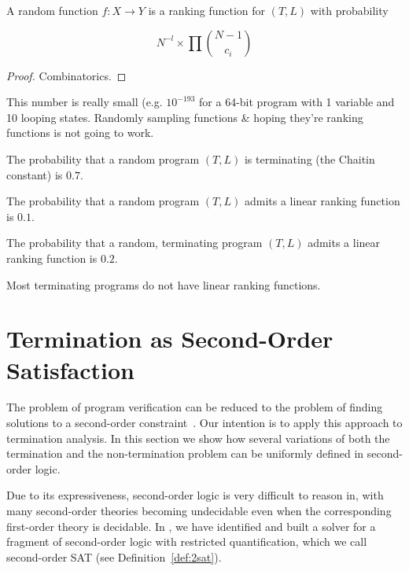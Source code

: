 \documentclass[a4paper]{llncs}
\begin{document}
\begin{theorem}
 A random function $f : X \to Y$ is a ranking function for $(T, L)$ with probability

 $$N^{-l} \times \prod {{N-1} \choose c_i}$$
\end{theorem}

\begin{proof}
 Combinatorics.
\end{proof}


\begin{corollary}
 This number is really small (e.g. $10^{-193}$ for a 64-bit program with 1 variable and 10 looping states.
 Randomly sampling functions \& hoping they're ranking functions is not going to work.
\end{corollary}


\begin{conjecture}
 The probability that a random program $(T, L)$ is terminating (the Chaitin constant)
 is $0.7$.
\end{conjecture}

\begin{conjecture}
 The probability that a random program $(T, L)$ admits a linear ranking function is
 $0.1$.
\end{conjecture}

\begin{conjecture}
 The probability that a random, terminating program $(T, L)$ admits a linear ranking function
 is $0.2$.
\end{conjecture}


\begin{corollary}
 Most terminating programs do not have linear ranking functions.
\end{corollary}
\fi


\section{Termination as Second-Order Satisfaction} \label{sec:second.order}


The problem of program verification can be reduced to the problem of finding
solutions to a second-order
constraint~\cite{DBLP:conf/pldi/GrebenshchikovLPR12,DBLP:conf/pldi/GulwaniSV08}. 
Our intention is to apply this approach to termination analysis.  In this
section we show how several variations of both the termination and the
non-termination problem can be uniformly defined in second-order logic.

Due to its expressiveness, second-order logic is very difficult to reason
in, with many second-order theories becoming undecidable even when the
corresponding first-order theory is decidable.
In \cite{}, we have identified and built a solver for a fragment of second-order logic with restricted quantification, 
which we call second-order SAT (see Definition~\ref{def:2sat}).
\end{document}
